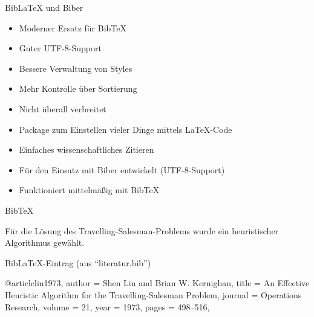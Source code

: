 \documentclass{beamer}
\begin{document}
		
		\begin{frame}{Bib\LaTeX{} und Biber}
			\begin{itemize}
				\item Moderner Ersatz für Bib\TeX{}
				\item Guter UTF-8-Support
				\item Bessere Verwaltung von Styles
				\item Mehr Kontrolle über Sortierung
				\item Nicht überall verbreitet
			\end{itemize}
			\begin{itemize}
				\item Package zum Einstellen vieler Dinge mittels \LaTeX{}-Code
				\item Einfaches wissenschaftliches Zitieren
				\item Für den Einsatz mit Biber entwickelt (UTF-8-Support)
				\item Funktioniert mittelmäßig mit Bib\TeX{}
			\end{itemize}
		\end{frame}


		\begin{frame}[containsverbatim]{Bib\TeX}
			\begin{latexcode}
\usepackage[backend=bibtex8,style=alphabetic]{biblatex}


Für die Lösung des Travelling-Salesman-Problems
wurde ein heuristischer Algorithmus \cite{lin1973}
gewählt.

\printbibliography

			\end{latexcode}
		\end{frame}


		\begin{frame}[containsverbatim]{Bib\LaTeX-Eintrag}
			 (aus ``literatur.bib'')
			\vspace{0.2cm}
			\begin{latexcode}
@article{lin1973,
	author  = {Shen Lin and Brian W. Kernighan},
	title   = {An Effective Heuristic Algorithm for the
	           Travelling-Salesman Problem},
	journal = {Operations Research},
	volume  = {21},
	year    = {1973},
	pages   = {498--516},
}
			\end{latexcode}
		\end{frame}
\end{document}
